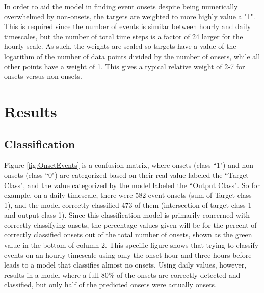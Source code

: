 In order to aid the model in finding event onsets despite being numerically overwhelmed by non-onsets, the targets are weighted to more highly value a "1". This is required since the number of events is similar between hourly and daily timescales, but the number of total time steps is a factor of 24 larger for the hourly scale. As such, the weights are scaled so targets have a value of the logarithm of the number of data points divided by the number of onsets, while all other points have a weight of 1. This gives a typical relative weight of 2-7 for onsets versus non-onsets. 


\section{Results}

\subsection{Classification} \label{sec:ClassifyResults}

Figure \ref{fig:OnsetEvents} is a confusion matrix, where onsets (class ``1") and non-onsets (class ``0") are categorized based on their real value labeled the ``Target Class", and the value categorized by the model labeled the ``Output Class". So for example, on a daily timescale, there were 582 event onsets (sum of Target class 1), and the model correctly classified 473 of them (intersection of target class 1 and output class 1). Since this classification model is primarily concerned with correctly classifying onsets, the percentage values given will be for the percent of correctly classified onsets out of the total number of onsets, shown as the green value in the bottom of column 2. This specific figure shows that trying to classify events on an hourly timescale using only the onset hour and three hours before leads to a model that classifies almost no onsets. Using daily values, however, results in a model where a full 80\% of the onsets are correctly detected and classified, but only half of the predicted onsets were actually onsets.

